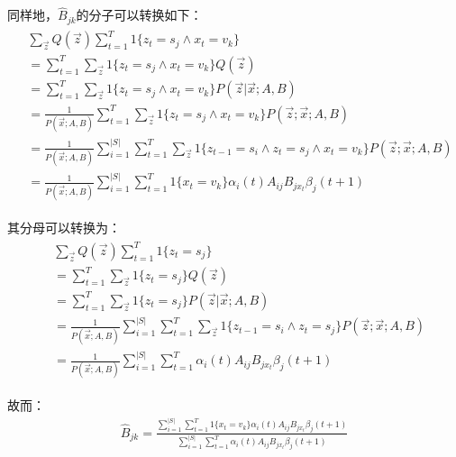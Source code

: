 同样地，$\hat{B}_{jk}$的分子可以转换如下：
\begin{align}
\begin{split}
 &\sum_{\vec{z}}Q(\vec{z})\sum_{t=1}^{T}1\{z_{t}=s_j\wedge{x_t=v_k}\} \\
 &= \sum_{t=1}^{T} \sum_{\vec{z}} 1\{z_{t}=s_j\wedge{x_t=v_k}\}Q(\vec{z}) \\
 &= \sum_{t=1}^{T} \sum_{\vec{z}} 1\{z_{t}=s_j\wedge{x_t=v_k}\}P(\vec{z}|\vec{x};A,B) \\
 &= \frac{1}{P(\vec{x};A,B)} \sum_{t=1}^{T} \sum_{\vec{z}} 1\{z_{t}=s_j\wedge{x_t=v_k}\} P(\vec{z};\vec{x};A,B) \\
 &= \frac{1}{P(\vec{x};A,B)} \sum_{i=1}^{|S|} \sum_{t=1}^{T} \sum_{\vec{z}} 1\{z_{t-1}=s_i\wedge z_{t}=s_j\wedge{x_t=v_k}\} P(\vec{z};\vec{x};A,B) \\
 &= \frac{1}{P(\vec{x};A,B)} \sum_{i=1}^{|S|} \sum_{t=1}^{T} 1\{x_t=v_k\} \alpha_{i}(t)A_{ij}B_{jx_{t}}\beta_{j}(t+1)
\end{split}
\end{align}

其分母可以转换为：
\begin{align}
\begin{split}
 &\sum_{\vec{z}}Q(\vec{z})\sum_{t=1}^{T}1\{z_{t}=s_j\} \\
 &= \sum_{t=1}^{T} \sum_{\vec{z}} 1\{z_{t}=s_j\}Q(\vec{z}) \\
 &= \sum_{t=1}^{T} \sum_{\vec{z}} 1\{z_{t}=s_j\}P(\vec{z}|\vec{x};A,B) \\
 &= \frac{1}{P(\vec{x};A,B)} \sum_{i=1}^{|S|} \sum_{t=1}^{T} \sum_{\vec{z}} 1\{z_{t-1}=s_i\wedge{z_t=s_j}\} P(\vec{z};\vec{x};A,B) \\
 &= \frac{1}{P(\vec{x};A,B)} \sum_{i=1}^{|S|} \sum_{t=1}^{T}\alpha_{i}(t)A_{ij}B_{jx_{t}}\beta_{j}(t+1)
\end{split}
\end{align}

故而：
\begin{align}
\hat{B}_{jk} = \frac{\sum_{i=1}^{|S|} \sum_{t=1}^{T} 1\{x_t=v_k\} \alpha_{i}(t)A_{ij}B_{jx_{t}}\beta_{j}(t+1)}{\sum_{i=1}^{|S|} \sum_{t=1}^{T}\alpha_{i}(t)A_{ij}B_{jx_{t}}\beta_{j}(t+1)}
\end{align}

